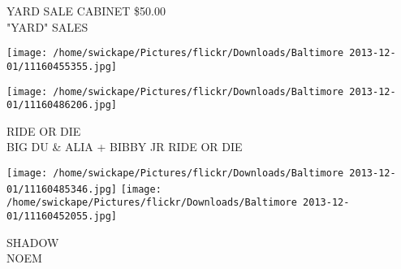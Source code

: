 \documentclass[10pt,letterpaper]{article}
\begin{document}
YARD SALE CABINET \$50.00\\
"YARD" SALES
\pagebreak

\texttt{[image: /home/swickape/Pictures/flickr/Downloads/Baltimore 2013-12-01/11160455355.jpg]}

\vspace{0.25in}
\texttt{[image: /home/swickape/Pictures/flickr/Downloads/Baltimore 2013-12-01/11160486206.jpg]}

RIDE OR DIE\\
BIG DU \& ALIA + BIBBY JR RIDE OR DIE
\pagebreak

\texttt{[image: /home/swickape/Pictures/flickr/Downloads/Baltimore 2013-12-01/11160485346.jpg]}
\texttt{[image: /home/swickape/Pictures/flickr/Downloads/Baltimore 2013-12-01/11160452055.jpg]}

SHADOW\\
NOEM
\pagebreak
\end{document}
